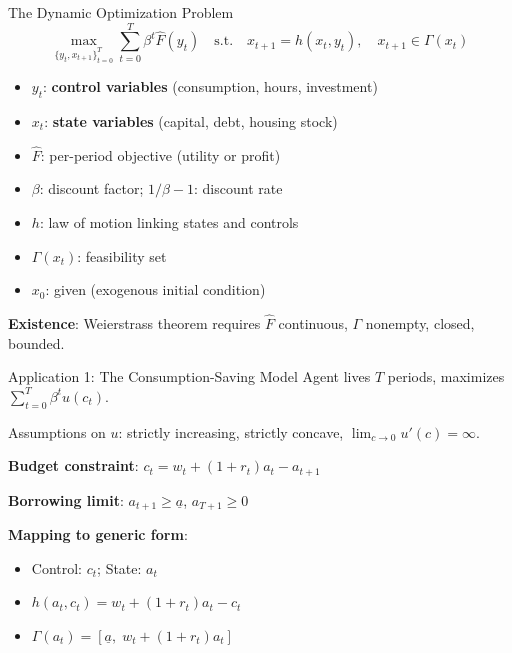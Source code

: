 \documentclass[blue]{beamer}
\begin{document}
\begin{frame}{The Dynamic Optimization Problem}
	\[
	\max_{\{y_t, x_{t+1}\}_{t=0}^T} \sum_{t=0}^T \beta^t \hat{F}(y_t) \quad \text{s.t.} \quad x_{t+1} = h(x_t, y_t), \quad x_{t+1} \in \Gamma(x_t)
	\]
	
	\begin{itemize}
		\item $y_t$: \textbf{control variables} (consumption, hours, investment)
		\item $x_t$: \textbf{state variables} (capital, debt, housing stock)
		\item $\hat{F}$: per-period objective (utility or profit)
		\item $\beta$: discount factor; $1/\beta - 1$: discount rate
		\item $h$: law of motion linking states and controls
		\item $\Gamma(x_t)$: feasibility set
		\item $x_0$: given (exogenous initial condition)
	\end{itemize}
	
	\bigskip
	\textbf{Existence}: Weierstrass theorem requires $\hat{F}$ continuous, $\Gamma$ nonempty, closed, bounded.
\end{frame}

\begin{frame}{Application 1: The Consumption-Saving Model}
	Agent lives $T$ periods, maximizes $\sum_{t=0}^T \beta^t u(c_t)$.
	
	\medskip
	Assumptions on $u$: strictly increasing, strictly concave, $\lim_{c \to 0} u'(c) = \infty$.
	
	\medskip
	\textbf{Budget constraint}: $c_t = w_t + (1+r_t)a_t - a_{t+1}$
	
	\textbf{Borrowing limit}: $a_{t+1} \geq \underline{a}$, \quad $a_{T+1} \geq 0$
	
	\bigskip
	\textbf{Mapping to generic form}:
	\begin{itemize}
		\item Control: $c_t$; State: $a_t$
		\item $h(a_t, c_t) = w_t + (1+r_t)a_t - c_t$
		\item $\Gamma(a_t) = [\underline{a},\; w_t + (1+r_t)a_t]$
	\end{itemize}
\end{frame}
\end{document}
